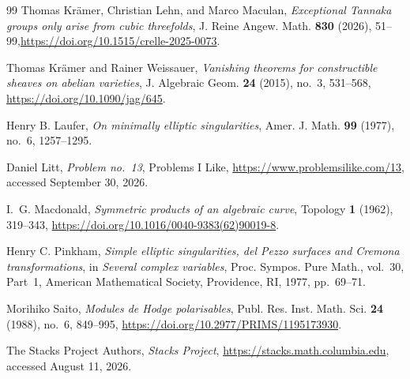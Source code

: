 \begin{thebibliography}{99}
Thomas Kr\"amer, Christian Lehn, and Marco Maculan,
\emph{Exceptional Tannaka groups only arise from cubic threefolds}, J. Reine Angew. Math. \textbf{830} (2026), 51--99,\newblock \url{https://doi.org/10.1515/crelle-2025-0073}.

Thomas Kr\"amer and Rainer Weissauer,
\emph{Vanishing theorems for constructible sheaves on abelian varieties}, J. Algebraic Geom. \textbf{24} (2015), no.~3, 531--568,
\newblock \url{https://doi.org/10.1090/jag/645}.

Henry B. Laufer,
\emph{On minimally elliptic singularities}, Amer. J. Math. \textbf{99} (1977), no.~6, 1257--1295.

Daniel Litt,
\emph{Problem no.~13}, Problems I Like, \url{https://www.problemsilike.com/13}, accessed September 30, 2026.

I.~G. Macdonald,
\emph{Symmetric products of an algebraic curve}, Topology \textbf{1} (1962), 319--343,
\newblock \url{https://doi.org/10.1016/0040-9383(62)90019-8}.

Henry C. Pinkham,
\emph{Simple elliptic singularities, del Pezzo surfaces and Cremona transformations}, in \emph{Several complex variables}, Proc. Sympos. Pure Math., vol.~30, Part~1, American Mathematical Society, Providence, RI, 1977, pp.~69--71.

Morihiko Saito,
\emph{Modules de Hodge polarisables}, Publ. Res. Inst. Math. Sci. \textbf{24} (1988), no.~6, 849--995,
\newblock \url{https://doi.org/10.2977/PRIMS/1195173930}.

The Stacks Project Authors,
\emph{Stacks Project}, \url{https://stacks.math.columbia.edu}, accessed August 11, 2026.

\end{thebibliography}


